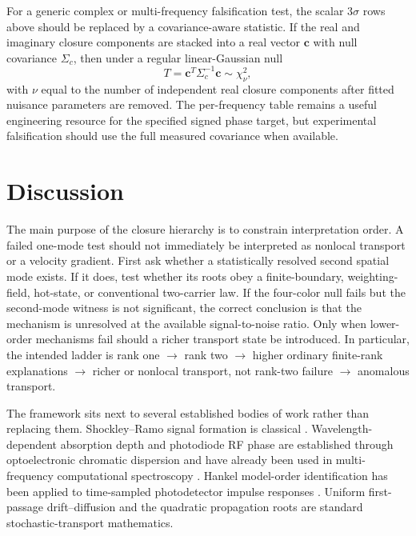 \documentclass[11pt]{article}
\begin{document}
For a generic complex or multi-frequency falsification test, the scalar $3\sigma$ rows above should be replaced by a covariance-aware statistic. If the real and imaginary closure components are stacked into a real vector $\mathbf c$ with null covariance $\Sigma_c$, then under a regular linear-Gaussian null
\begin{equation}
\boxed{T=\mathbf c^{T}\Sigma_c^{-1}\mathbf c\sim\chi^2_{\nu},}
\label{eq:complex_closure_stat}
\end{equation}
with $\nu$ equal to the number of independent real closure components after fitted nuisance parameters are removed. The per-frequency table remains a useful engineering resource for the specified signed phase target, but experimental falsification should use the full measured covariance when available.

\section{Discussion}

The main purpose of the closure hierarchy is to constrain interpretation order. A failed one-mode test should not immediately be interpreted as nonlocal transport or a velocity gradient. First ask whether a statistically resolved second spatial mode exists. If it does, test whether its roots obey a finite-boundary, weighting-field, hot-state, or conventional two-carrier law. If the four-color null fails but the second-mode witness is not significant, the correct conclusion is that the mechanism is unresolved at the available signal-to-noise ratio. Only when lower-order mechanisms fail should a richer transport state be introduced. In particular, the intended ladder is rank one $\rightarrow$ rank two $\rightarrow$ higher ordinary finite-rank explanations $\rightarrow$ richer or nonlocal transport, not rank-two failure $\rightarrow$ anomalous transport.

The framework sits next to several established bodies of work rather than replacing them. Shockley--Ramo signal formation is classical \cite{Shockley1938,Ramo1939,Dabrowski1989}. Wavelength-dependent absorption depth and photodiode RF phase are established through optoelectronic chromatic dispersion \cite{Glasser2021} and have already been used in multi-frequency computational spectroscopy \cite{Kassa2026}. Hankel model-order identification has been applied to time-sampled photodetector impulse responses \cite{Sun2025}. Uniform first-passage drift--diffusion and the quadratic propagation roots are standard stochastic-transport mathematics.
\end{document}
